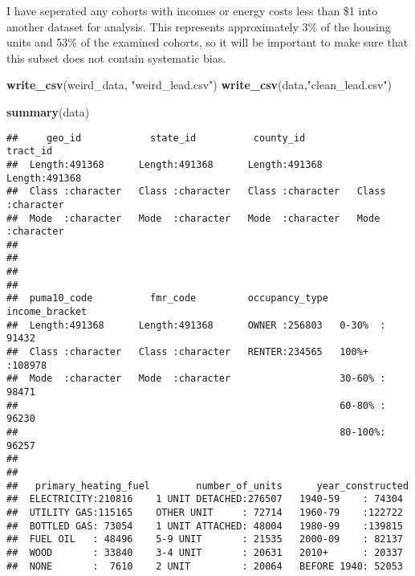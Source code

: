 \documentclass[]{article}
\newenvironment{Shaded}{\begin{snugshade}}{\end{snugshade}}
\newcommand{\KeywordTok}[1]{\textcolor[rgb]{0.13,0.29,0.53}{\textbf{#1}}}
\newcommand{\NormalTok}[1]{#1}
\newcommand{\StringTok}[1]{\textcolor[rgb]{0.31,0.60,0.02}{#1}}
\begin{document}
I have seperated any cohorts with incomes or energy costs less than \$1
into another dataset for analysis. This represents approximately 3\% of
the housing units and 53\% of the examined cohorts, so it will be
important to make sure that this subset does not contain systematic
bias.

\begin{Shaded}
\begin{Highlighting}[]
\KeywordTok{write_csv}\NormalTok{(weird_data, }\StringTok{"weird_lead.csv"}\NormalTok{)}
\KeywordTok{write_csv}\NormalTok{(data,}\StringTok{"clean_lead.csv"}\NormalTok{)}

\KeywordTok{summary}\NormalTok{(data)}
\end{Highlighting}
\end{Shaded}

\begin{verbatim}
##     geo_id            state_id          county_id           tract_id        
##  Length:491368      Length:491368      Length:491368      Length:491368     
##  Class :character   Class :character   Class :character   Class :character  
##  Mode  :character   Mode  :character   Mode  :character   Mode  :character  
##                                                                             
##                                                                             
##                                                                             
##                                                                             
##  puma10_code          fmr_code         occupancy_type  income_bracket  
##  Length:491368      Length:491368      OWNER :256803   0-30%  : 91432  
##  Class :character   Class :character   RENTER:234565   100%+  :108978  
##  Mode  :character   Mode  :character                   30-60% : 98471  
##                                                        60-80% : 96230  
##                                                        80-100%: 96257  
##                                                                        
##                                                                        
##   primary_heating_fuel        number_of_units      year_constructed 
##  ELECTRICITY:210816    1 UNIT DETACHED:276507   1940-59    : 74304  
##  UTILITY GAS:115165    OTHER UNIT     : 72714   1960-79    :122722  
##  BOTTLED GAS: 73054    1 UNIT ATTACHED: 48004   1980-99    :139815  
##  FUEL OIL   : 48496    5-9 UNIT       : 21535   2000-09    : 82137  
##  WOOD       : 33840    3-4 UNIT       : 20631   2010+      : 20337  
##  NONE       :  7610    2 UNIT         : 20064   BEFORE 1940: 52053  

\end{verbatim}
\end{document}
